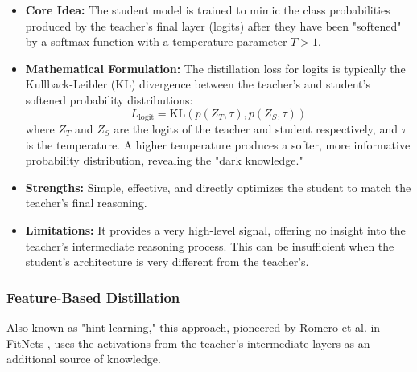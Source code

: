 \begin{itemize}
    \item \textbf{Core Idea:} The student model is trained to mimic the class probabilities produced by the teacher's final layer (logits) after they have been "softened" by a softmax function with a temperature parameter \(T > 1\).
    \item \textbf{Mathematical Formulation:} The distillation loss for logits is typically the Kullback-Leibler (KL) divergence between the teacher's and student's softened probability distributions:
    \[
        L_{\text{logit}} = \text{KL}(p(Z_T, \tau), p(Z_S, \tau))
    \]
    where \(Z_T\) and \(Z_S\) are the logits of the teacher and student respectively, and \(\tau\) is the temperature. A higher temperature produces a softer, more informative probability distribution, revealing the "dark knowledge."
    \item \textbf{Strengths:} Simple, effective, and directly optimizes the student to match the teacher's final reasoning.
    \item \textbf{Limitations:} It provides a very high-level signal, offering no insight into the teacher's intermediate reasoning process. This can be insufficient when the student's architecture is very different from the teacher's.
\end{itemize}

\subsubsection{Feature-Based Distillation}
\label{ssec:feature_based}

Also known as "hint learning," this approach, pioneered by Romero et al. in FitNets \cite{Romero2014}, uses the activations from the teacher's intermediate layers as an additional source of knowledge.

